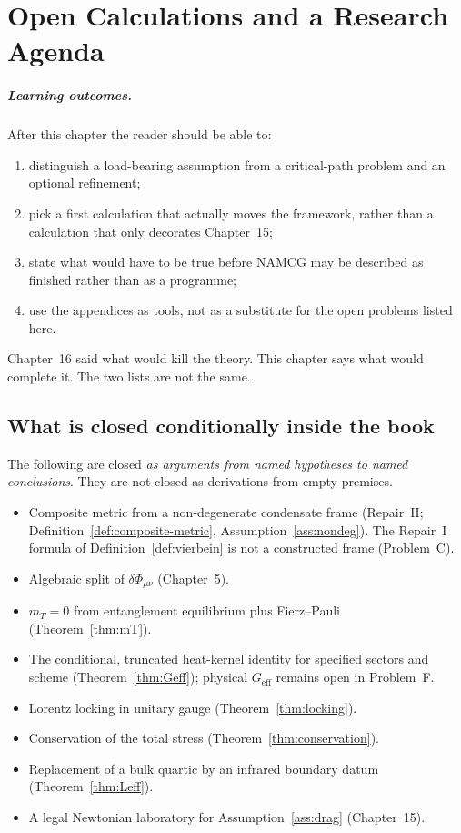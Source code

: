 \chapter[Research agenda]{Open Calculations and a Research Agenda}
\label{ch:agenda}

\paragraph{Learning outcomes.}
After this chapter the reader should be able to:
\begin{enumerate}
  \item distinguish a load-bearing assumption from a critical-path
        problem and an optional refinement;
  \item pick a first calculation that actually moves the framework,
        rather than a calculation that only decorates Chapter~15;
  \item state what would have to be true before NAMCG may be
        described as finished rather than as a programme;
  \item use the appendices as tools, not as a substitute for the
        open problems listed here.
\end{enumerate}

Chapter~16 said what would kill the theory. This chapter says what
would complete it. The two lists are not the same.

\section{What is closed conditionally inside the book}
\label{sec:ch17-closed}

The following are closed \emph{as arguments from named hypotheses
to named conclusions}. They are not closed as derivations from
empty premises.

\begin{itemize}
  \item Composite metric from a non-degenerate condensate frame
        (Repair~II; Definition~\ref{def:composite-metric},
        Assumption~\ref{ass:nondeg}). The Repair~I formula of
        Definition~\ref{def:vierbein} is not a constructed frame
        (Problem~C).
  \item Algebraic split of \(\delta\Phi_{\mu\nu}\) (Chapter~5).
  \item \(m_T=0\) from entanglement equilibrium plus Fierz--Pauli
        (Theorem~\ref{thm:mT}).
  \item The conditional, truncated heat-kernel identity for specified
        sectors and scheme (Theorem~\ref{thm:Geff}); physical
        \(G_{\mathrm{eff}}\) remains open in Problem~F.
  \item Lorentz locking in unitary gauge
        (Theorem~\ref{thm:locking}).
  \item Conservation of the total stress
        (Theorem~\ref{thm:conservation}).
  \item Replacement of a bulk quartic by an infrared boundary
        datum (Theorem~\ref{thm:Leff}).
  \item A legal Newtonian laboratory for
        Assumption~\ref{ass:drag} (Chapter~15).
\end{itemize}

